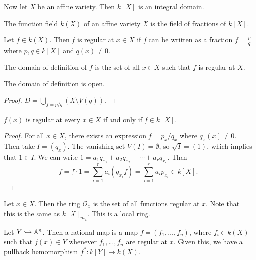 \documentclass[twoside, 10pt]{article}
\begin{document}
    Now let $X$ be an affine variety. Then $k[X]$ is an integral domain.
    \begin{defn} The function field $k(X)$ of an affine variety
    $X$ is the field of fractions of $k[X]$.  \end{defn}

    \begin{defn} Let $f \in k(X)$. Then $f$ is regular at $x
    \in X$ if $f$ can be written as a fraction $f = \frac{p}{q}$ where $p,q \in
k[X]$ and $q(x) \neq 0$.  \end{defn}

    \begin{defn} The domain of definition of $f$ is the
    set of all $x \in X$ such that $f$ is regular at $X$.  \end{defn}

    \begin{prop} The domain of definition is open.  \begin{proof} $D =
    \bigcup_{f = p/q} (X\setminus V(q))$.  \end{proof} \end{prop}

    \begin{prop} $f(x)$ is regular at every $x \in X$ if and only if $f \in
        k[X]$.  \begin{proof} For all $x \in X$, there exists an expression $f
            = p_x/q_x$ where $q_x(x) \neq 0$. Then take $I = (q_x)$. The
            vanishing set $V(I) = \emptyset$, so $\sqrt{I} = (1)$, which
            implies that $1 \in I$. We can write $1 = a_1q_{x_1} + a_2q_{x_2} +
            \cdots + a_rq_{x_r}$. Then \[ f = f \cdot 1 = \sum_{i=1}^r
            a_i(q_{x_i}f) = \sum_{i=1}^r a_ip_{x_i} \in k[X]. \] \end{proof}
        \end{prop}
    
    \begin{defn} Let $x \in X$. Then the ring
    $\mathcal{O}_x$ is the set of all functions regular at $x$. Note that this
is the same as $k[X]_{m_x}$.  This is a local ring.  \end{defn}

    \begin{defn} Let $Y \hookrightarrow \mathbb{A}^n$. Then a rational
        map is a map $f = (f_1, \ldots, f_n)$, where $f_i \in k(X)$ such that
        $f(x) \in Y$ whenever $f_1, \ldots, f_n$ are regular at $x$. Given
        this, we have a pullback homomorphism $f^*: k[Y] \rightarrow k(X)$.
    \end{defn}
\end{document}
